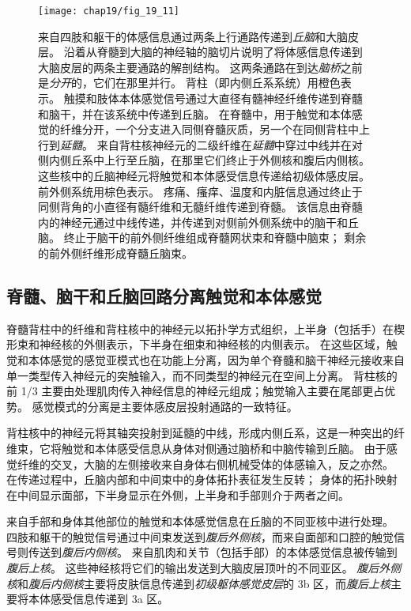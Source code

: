 \begin{figure}[htbp]
	\centering
	\texttt{[image: chap19/fig\_19\_11]}
	\caption{来自四肢和躯干的体感信息通过两条上行通路传递到\textit{丘脑}和大脑皮层。
		沿着从脊髓到大脑的神经轴的脑切片说明了将体感信息传递到大脑皮层的两条主要通路的解剖结构。
		这两条通路在到达\textit{脑桥}之前是\textit{分开}的，它们在那里并行。
		背柱（即内侧丘系系统）用橙色表示。
		触摸和肢体本体感觉信号通过大直径有髓神经纤维传递到脊髓和脑干，并在该系统中传递到丘脑。
		在脊髓中，用于触觉和本体感觉的纤维分开，一个分支进入同侧脊髓灰质，另一个在同侧背柱中上行到\textit{延髓}。
		来自背柱核神经元的二级纤维在\textit{延髓}中穿过中线并在对侧内侧丘系中上行至丘脑，在那里它们终止于外侧核和腹后内侧核。
		这些核中的丘脑神经元将触觉和本体感受信息传递给初级体感皮层。
		前外侧系统用棕色表示。
		疼痛、瘙痒、温度和内脏信息通过终止于同侧背角的小直径有髓纤维和无髓纤维传递到脊髓。
		该信息由脊髓内的神经元通过中线传递，并传递到对侧前外侧系统中的脑干和丘脑。
		终止于脑干的前外侧纤维组成脊髓网状束和脊髓中脑束； 剩余的前外侧纤维形成脊髓丘脑束。}
	\label{fig:19_11}
\end{figure}



\subsection{脊髓、脑干和丘脑回路分离触觉和本体感觉}

脊髓背柱中的纤维和背柱核中的神经元以拓扑学方式组织，上半身（包括手）在楔形束和神经核的外侧表示，下半身在细束和神经核的内侧表示。
在这些区域，触觉和本体感觉的感觉亚模式也在功能上分离，因为单个脊髓和脑干神经元接收来自单一类型传入神经元的突触输入，而不同类型的神经元在空间上分离。
背柱核的前 1/3 主要由处理肌肉传入神经信息的神经元组成；触觉输入主要在尾部更占优势。
感觉模式的分离是主要体感皮层投射通路的一致特征。


背柱核中的神经元将其轴突投射到延髓的中线，形成内侧丘系，这是一种突出的纤维束，它将触觉和本体感受信息从身体对侧通过脑桥和中脑传输到丘脑。
由于感觉纤维的交叉，大脑的左侧接收来自身体右侧机械受体的体感输入，反之亦然。
在传递过程中，丘脑内部和中间束中的身体拓扑表征发生反转；
身体的拓扑映射在中间显示面部，下半身显示在外侧，上半身和手部则介于两者之间。


来自手部和身体其他部位的触觉和本体感觉信息在丘脑的不同亚核中进行处理。
四肢和躯干的触觉信号通过中间束发送到\textit{腹后外侧核}，而来自面部和口腔的触觉信号则传送到\textit{腹后内侧核}。
来自肌肉和关节（包括手部）的本体感觉信息被传输到\textit{腹后上核}。
这些神经核将它们的输出发送到大脑皮层顶叶的不同亚区。
\textit{腹后外侧核}和\textit{腹后内侧核}主要将皮肤信息传递到\textit{初级躯体感觉皮层}的 3b 区，而\textit{腹后上核}主要将本体感受信息传递到 3a 区。



